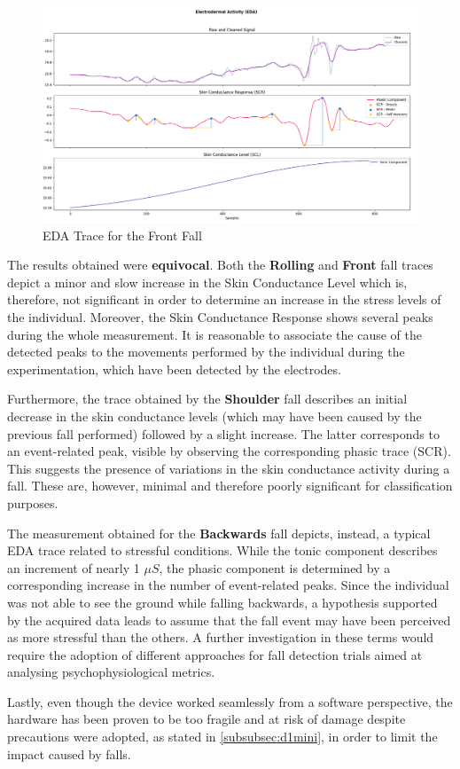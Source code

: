 \begin{figure}[H]
    \centering
    \includegraphics[width=\textwidth]{./images/bitalino/Front.png}
    \caption{EDA Trace for the Front Fall}
    \label{fig:bitalino-front}
\end{figure}

\pagebreak

The results obtained were \textbf{equivocal}. Both the \textbf{Rolling} and \textbf{Front} fall traces depict a minor and slow increase in the Skin Conductance Level which is, therefore, not significant in order to determine an increase in the stress levels of the individual. Moreover, the Skin Conductance Response shows several peaks during the whole measurement. It is reasonable to associate the cause of the detected peaks to the movements performed by the individual during the experimentation, which have been detected by the electrodes.

Furthermore, the trace obtained by the \textbf{Shoulder} fall describes an initial decrease in the skin conductance levels (which may have been caused by the previous fall performed) followed by a slight increase. The latter corresponds to an event-related peak, visible by observing the corresponding phasic trace (SCR). This suggests the presence of variations in the skin conductance activity during a fall. These are, however, minimal and therefore poorly significant for classification purposes.

The measurement obtained for the \textbf{Backwards} fall depicts, instead, a typical EDA trace related to stressful conditions. While the tonic component describes an increment of nearly 1 $\mu S$, the phasic component is determined by a corresponding increase in the number of event-related peaks. Since the individual was not able to see the ground while falling backwards, a hypothesis supported by the acquired data leads to assume that the fall event may have been perceived as more stressful than the others. A further investigation in these terms would require the adoption of different approaches for fall detection trials aimed at analysing psychophysiological metrics.

Lastly, even though the device worked seamlessly from a software perspective, the hardware has been proven to be too fragile and at risk of damage despite precautions were adopted, as stated in \ref{subsubsec:d1mini}, in order to limit the impact caused by falls.



